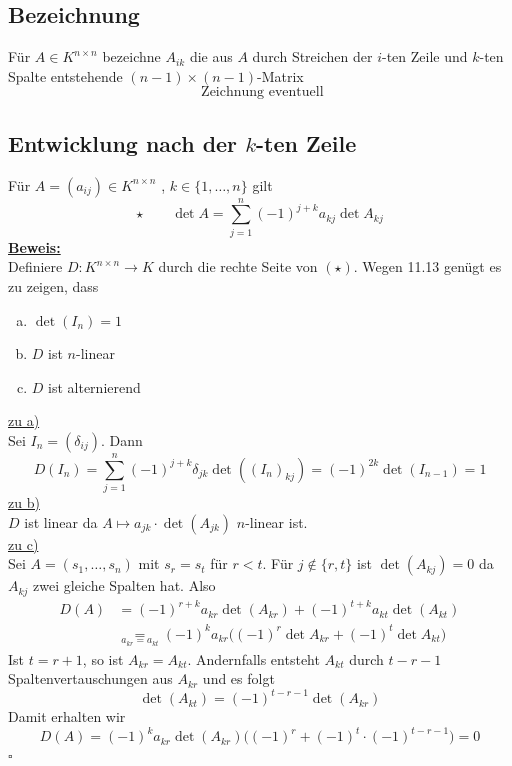 \subsection{Bezeichnung} %
\label{sub:bezeichnung}
Für $A \in K^{n \times n}$ bezeichne $A_{ik}$ die aus $A$ durch Streichen der $i$-ten Zeile und $k$-ten Spalte entstehende $(n-1) \times (n-1)$-Matrix
\[
	\text{ Zeichnung eventuell}
\]

\subsection{Entwicklung nach der $k$-ten Zeile} %
\label{sub:entwicklung_nach_der_k_tem_spalte}
Für $A= (a_{ij}) \in K^{n \times n}$ , $k \in \{ 1, \ldots , n \}$ gilt
\[
	\star \qquad \det A = \sum\limits_{j=1}^{n} (-1)^{j+k} a_{kj} \det A_{kj}
\]
\underline{\textbf{Beweis:}} \\
Definiere $D : K^{n \times n} \to K$ durch die rechte Seite von $(\star)$. Wegen 11.13 genügt es zu zeigen, dass 
\begin{enumerate}[a)]
	\item $\det(I_n) = 1$
	\item $D$ ist $n$-linear
	\item $D$ ist alternierend
\end{enumerate}
\underline{zu a)} \\
Sei $I_n = (\delta_{ij})$. Dann 
\[
		D(I_n)= \sum\limits_{j=1}^{n}(-1)^{j+k} \delta_{jk} \det ( (I_n)_{kj}) = (-1)^{2k} \det (I_{n-1}) = 1
\]
\underline{zu b)} \\
$D$ ist linear da $A \mapsto a_{jk} \cdot \det (A_{jk})$ $n$-linear ist.
\vspace{10pt} \\
\underline{zu c)} \\
Sei $A=(s_1, \ldots , s_n)$ mit $s_r= s_t$ für $r <t$. Für $j \not\in \{ r,t \}$ ist $\det (A_{kj})=0$ da $A_{kj}$ zwei gleiche Spalten hat. Also
\begin{align*}
		D(A) &= (-1)^{r+k} a_{kr} \det (A_{kr}) + (-1)^{t+k} a_{kt} \det (A_{kt})  \\
		& \underset{a_{kr}=a_{kt}}{=} (-1)^k a_{kr} \Big( (-1)^r \det A_{kr} + (-1)^t \det A_{kt} \Big) 
\end{align*}
Ist $t= r+1$, so ist $A_{kr}= A_{kt}$. Andernfalls entsteht $A_{kt}$ durch $t-r-1$ Spaltenvertauschungen aus $A_{kr}$ und es folgt
\[
	\det (A_{kt})= (-1)^{t-r-1} \det (A_{kr})
\]
Damit erhalten wir 
\[
	D(A)= (-1)^k a_{kr} \det (A_{kr}) \Big( (-1)^r + (-1)^t \cdot (-1)^{t-r-1} \Big) = 0
\]
\hfill \( \square \)

